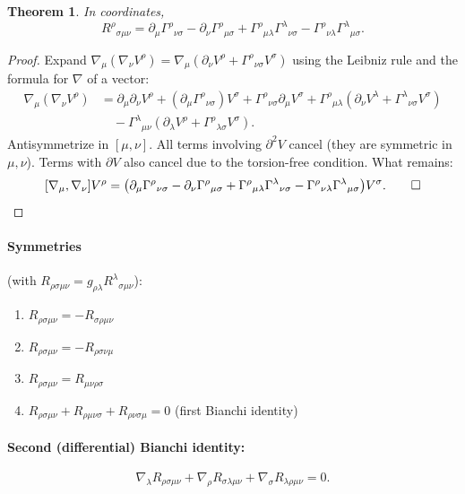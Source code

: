 \documentclass[12pt,a4paper]{article}
\theoremstyle{plain}
\newtheorem{theorem}{Theorem}[section]
\theoremstyle{definition}
\theoremstyle{remark}
\begin{document}
\begin{theorem}\label{thm:riemann}
In coordinates,
\[
  R^\rho{}_{\sigma\mu\nu}
  = \partial_\mu\Gamma^\rho{}_{\nu\sigma}
  - \partial_\nu\Gamma^\rho{}_{\mu\sigma}
  + \Gamma^\rho{}_{\mu\lambda}\Gamma^\lambda{}_{\nu\sigma}
  - \Gamma^\rho{}_{\nu\lambda}\Gamma^\lambda{}_{\mu\sigma}.
\]
\end{theorem}
\begin{proof}
Expand $\nabla_\mu(\nabla_\nu V^\rho) = \nabla_\mu(\partial_\nu V^\rho + \Gamma^\rho{}_{\nu\sigma}V^\sigma)$ using the Leibniz rule and the formula for $\nabla$ of a vector:
\begin{align*}
  \nabla_\mu(\nabla_\nu V^\rho)
  &= \partial_\mu\partial_\nu V^\rho
     + (\partial_\mu\Gamma^\rho{}_{\nu\sigma})V^\sigma
     + \Gamma^\rho{}_{\nu\sigma}\partial_\mu V^\sigma
     + \Gamma^\rho{}_{\mu\lambda}(\partial_\nu V^\lambda + \Gamma^\lambda{}_{\nu\sigma}V^\sigma)\\
  &\quad - \Gamma^\lambda{}_{\mu\nu}(\partial_\lambda V^\rho + \Gamma^\rho{}_{\lambda\sigma}V^\sigma).
\end{align*}
Antisymmetrize in $[\mu,\nu]$. All terms involving $\partial^2 V$ cancel (they are symmetric in $\mu,\nu$). Terms with $\partial V$ also cancel due to the torsion-free condition. What remains:
\[
  [\nabla_\mu,\nabla_\nu]V^\rho
  = \bigl(\partial_\mu\Gamma^\rho{}_{\nu\sigma} - \partial_\nu\Gamma^\rho{}_{\mu\sigma}
    + \Gamma^\rho{}_{\mu\lambda}\Gamma^\lambda{}_{\nu\sigma}
    - \Gamma^\rho{}_{\nu\lambda}\Gamma^\lambda{}_{\mu\sigma}\bigr)V^\sigma. \qed
\]
\end{proof}

\paragraph{Symmetries} (with $R_{\rho\sigma\mu\nu} = g_{\rho\lambda}R^\lambda{}_{\sigma\mu\nu}$):
\begin{enumerate}[label=(\roman*)]
  \item $R_{\rho\sigma\mu\nu} = -R_{\sigma\rho\mu\nu}$
  \item $R_{\rho\sigma\mu\nu} = -R_{\rho\sigma\nu\mu}$
  \item $R_{\rho\sigma\mu\nu} = R_{\mu\nu\rho\sigma}$
  \item $R_{\rho\sigma\mu\nu}+R_{\rho\mu\nu\sigma}+R_{\rho\nu\sigma\mu}=0$ \quad (first Bianchi identity)
\end{enumerate}

\paragraph{Second (differential) Bianchi identity:}
\[
  \nabla_\lambda R_{\rho\sigma\mu\nu}+\nabla_\rho R_{\sigma\lambda\mu\nu}+\nabla_\sigma R_{\lambda\rho\mu\nu}=0.
\]
\end{document}
